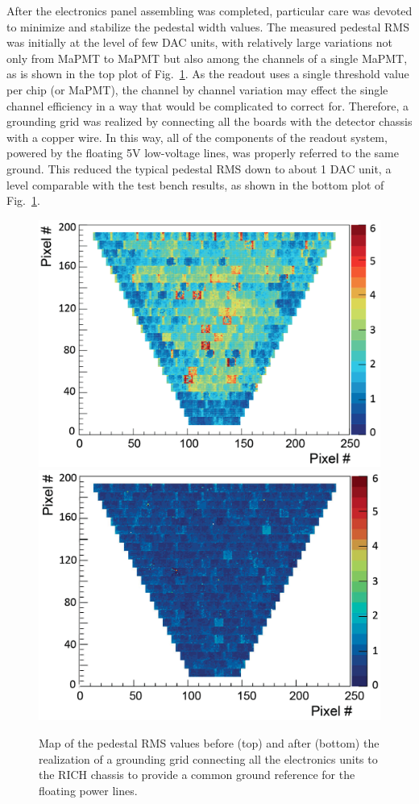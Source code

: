 \documentclass[5p,times,twocolumn]{elsarticle}
\begin{document}
After the electronics panel assembling was completed, particular care was devoted to minimize and stabilize the
pedestal width values. The measured pedestal RMS was initially at the level of few DAC units, with relatively large
variations not only from MaPMT to MaPMT but also among the channels of a single MaPMT, as is shown in the top
plot of Fig.~\ref{fig:GroundG}. As the readout uses a single threshold value per chip (or MaPMT), the channel by
channel variation may effect the single channel efficiency in a way that  would be complicated to correct for.
Therefore, a grounding grid was realized by connecting all the boards with the detector chassis with a copper wire.
In this way, all of the components of the readout system, powered by the floating 5V low-voltage lines, was properly
referred to the same ground. This reduced the typical pedestal RMS down to about 1 DAC unit, a level comparable
with the test bench results, as shown in the bottom plot of Fig.~\ref{fig:GroundG}.

\begin{figure}[t]
\begin{center}
\includegraphics[width=0.9\columnwidth]{pedestal_rms_before.png}
\includegraphics[width=0.9\columnwidth]{pedestal_rms_after.png}
\end{center}
\caption{Map of the pedestal RMS values before (top) and after (bottom) the realization of a grounding grid
  connecting all the electronics units to the RICH chassis to provide a common ground reference for the floating
  power lines.}
\label{fig:GroundG}
\end{figure}
\end{document}
